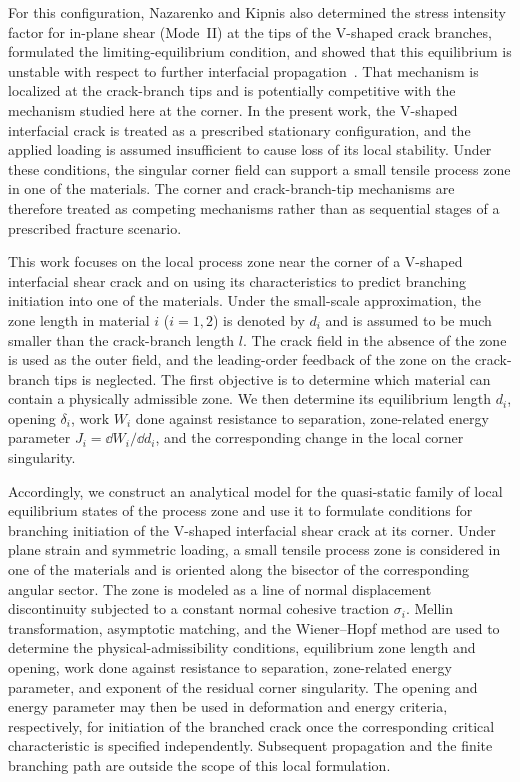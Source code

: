 For this configuration, Nazarenko and Kipnis also determined the stress
intensity factor for in-plane shear (Mode~II) at the tips of the
V-shaped crack branches, formulated the limiting-equilibrium condition, and showed
that this equilibrium is unstable with respect to further interfacial
propagation~\cite{NazarenkoKipnis2022Equilibrium}. That mechanism is localized
at the crack-branch tips and is potentially competitive with the mechanism studied
here at the corner. In the present work, the V-shaped interfacial crack is
treated as a prescribed stationary configuration, and the applied loading is
assumed insufficient to cause loss of its local stability. Under these
conditions, the singular corner field can support a small tensile process
zone in one of the materials. The corner and crack-branch-tip mechanisms are
therefore treated as competing mechanisms rather than as sequential stages
of a prescribed fracture scenario.

This work focuses on the local process zone near the corner of a V-shaped
interfacial shear crack and on using its characteristics to predict
branching initiation into one of the materials. Under the small-scale
approximation, the zone length in material $i$ ($i=1,2$) is denoted by $d_i$
and is assumed to be much smaller than the crack-branch length $l$. The crack field in the absence of the zone is used as the outer field, and
the leading-order feedback of the zone on the crack-branch tips is neglected.
The first objective is to determine which material can contain a physically
admissible zone. We then determine its equilibrium length $d_i$, opening
$\delta_i$, work $W_i$ done against resistance to separation, zone-related
energy parameter $J_i=\dd W_i/\dd d_i$, and the corresponding change in the
local corner singularity.

Accordingly, we construct an analytical model for the quasi-static family of
local equilibrium states of the process zone and use it to formulate
conditions for branching initiation of the V-shaped interfacial shear crack
at its corner. Under plane strain and symmetric loading, a small tensile
process zone is considered in one of the materials and is oriented along the
bisector of the corresponding angular sector. The zone is modeled as a line
of normal displacement discontinuity subjected to a constant normal cohesive
traction $\sigma_i$. Mellin transformation, asymptotic matching, and the Wiener--Hopf method are
used to determine the physical-admissibility conditions, equilibrium zone
length and opening, work done against resistance to separation, zone-related
energy parameter, and exponent of the residual corner singularity. The opening
and energy parameter may then be used in deformation and energy criteria,
respectively, for initiation of the branched crack once the corresponding
critical characteristic is specified independently. Subsequent propagation and the finite branching path
are outside the scope of this local formulation.

